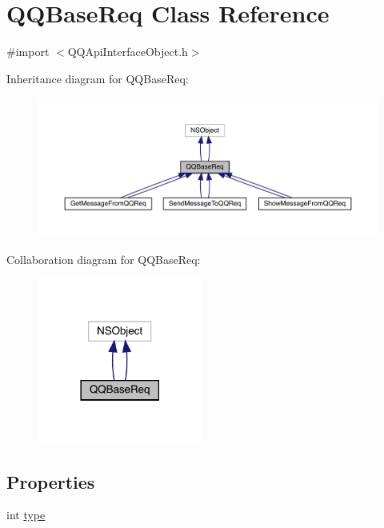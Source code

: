 \hypertarget{interface_q_q_base_req}{}\section{Q\+Q\+Base\+Req Class Reference}
\label{interface_q_q_base_req}


{\ttfamily \#import $<$Q\+Q\+Api\+Interface\+Object.\+h$>$}



Inheritance diagram for Q\+Q\+Base\+Req\+:\nopagebreak
\begin{figure}[H]
\begin{center}
\leavevmode
\includegraphics[width=350pt]{interface_q_q_base_req__inherit__graph}
\end{center}
\end{figure}


Collaboration diagram for Q\+Q\+Base\+Req\+:\nopagebreak
\begin{figure}[H]
\begin{center}
\leavevmode
\includegraphics[width=153pt]{interface_q_q_base_req__coll__graph}
\end{center}
\end{figure}
\subsection*{Properties}
\begin{DoxyCompactItemize}
\item 
int \mbox{\hyperlink{interface_q_q_base_req_aa12984f100b018da0137a268faa4335d}{type}}
\end{DoxyCompactItemize}


